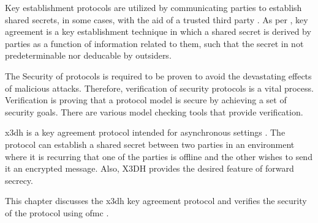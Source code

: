 
Key establishment protocols are utilized by communicating parties to establish shared secrets, in some cases, with the aid of a trusted third party \cite{handbookOfAppliedCrypto}. As per \cite{handbookOfAppliedCrypto}, key agreement is a key establishment technique in which a shared secret is derived by parties as a function of information related to them, such that the secret in not predeterminable nor deducable by outsiders.
\par
The Security of protocols is required to be proven to avoid the devastating effects of malicious attacks. Therefore, verification of security protocols is a vital process. Verification is proving that a protocol model is secure by achieving a set of security goals. There are various model checking tools that provide verification.
\par
\gls{x3dh} is a key agreement protocol intended for asynchronous settings \cite{x3dh}. The protocol can establish a shared secret between two parties in an environment where it is recurring that one of the parties is offline and the other wishes to send it an encrypted message. Also, X3DH provides the desired feature of forward secrecy. 
\par
This chapter discusses the \gls{x3dh} key agreement protocol \cite{x3dh} and verifies the security of the protocol using \gls{ofmc} \cite{ofmc}.